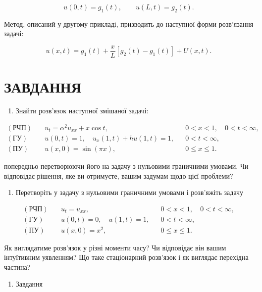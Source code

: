 \documentclass[
  ukrainian,
]{article}
\providecommand{\tightlist}{%
  \setlength{\itemsep}{0pt}\setlength{\parskip}{0pt}}
\begin{document}
\[
u(0, t)=g_1(t), \qquad u(L, t)=g_2(t).
\]

Метод, описаний у другому прикладі, призводить до наступної форми
розв'язання задачі:

\[
u(x, t)=g_1(t)+\frac{x}{L}\left[g_2(t)-g_1(t)\right]+U(x, t).
\]

\section{ЗАВДАННЯ}\label{ux437ux430ux432ux434ux430ux43dux43dux44f-5}

\begin{enumerate}
\def\labelenumi{\arabic{enumi}.}
\tightlist
\item
  Знайти розв'язок наступної змішаної задачі:
\end{enumerate}

\[
\begin{aligned}
(\text{РЧП})\quad & u_t = \alpha^2 u_{xx} + x\cos t, && 0 < x < 1,\quad 0 < t < \infty, \\
(\text{ГУ})\quad & u(0,t) = 1,\quad u_x(1,t) + hu(1,t) = 1, && 0 < t < \infty, \\
(\text{ПУ})\quad & u(x,0) = \sin(\pi x), && 0 \leqslant x \leqslant 1.
\end{aligned}
\]

попередньо перетворюючи його на задачу з нульовими граничними умовами.
Чи відповідає рішення, яке ви отримуєте, вашим задумам щодо цієї
проблеми?

\begin{enumerate}
\def\labelenumi{\arabic{enumi}.}
\setcounter{enumi}{1}
\tightlist
\item
  Перетворіть у задачу з нульовими граничними умовами і розв'яжіть
  задачу
\end{enumerate}

\[
\begin{aligned}
(\text{РЧП})\quad & u_t = u_{xx}, && 0 < x < 1,\quad 0 < t < \infty, \\
(\text{ГУ})\quad & u(0,t)=0,\quad u(1,t)=1, && 0 < t < \infty, \\
(\text{ПУ})\quad & u(x,0)=x^2, && 0 \le x \le 1.
\end{aligned}
\]

Як виглядатиме розв'язок у різні моменти часу? Чи відповідає він вашим
інтуїтивним уявленням? Що таке стаціонарний розв'язок і як виглядає
перехідна частина?

\begin{enumerate}
\def\labelenumi{\arabic{enumi}.}
\setcounter{enumi}{2}
\tightlist
\item
  Завдання
\end{enumerate}
\end{document}
